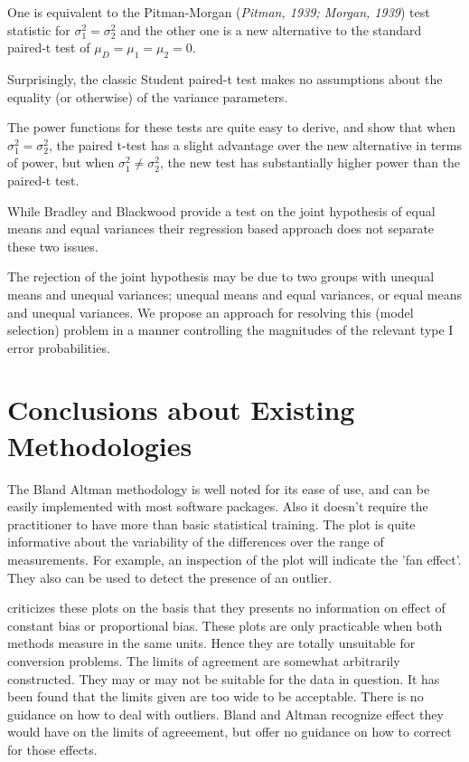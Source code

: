 \documentclass[MAIN.tex]{subfiles}
\begin{document}
	One is equivalent to the Pitman-Morgan (\textit{Pitman, 1939; Morgan, 1939}) test statistic 
	for $\sigma^2_1 = \sigma^2_2$ and the other one is a new alternative to the standard paired-t test of $\mu_D = \mu_1 = \mu_2 = 0$. 
	
	Surprisingly, the classic Student paired-t test makes no assumptions about the equality (or otherwise) of the 
	variance parameters. 
	
	The power functions for these tests are quite easy to derive, and show that when $\sigma^2_1 = \sigma^2_2$, 
	the paired t-test has a slight advantage over the new alternative in terms of power, but when $\sigma^2_1 \neq \sigma^2_2$, the 
	new test has substantially higher power than the paired-t test.
	
	While Bradley and Blackwood provide a test on the joint hypothesis of equal means and equal variances their regression based approach does not separate these two issues.
	
	The rejection of the joint hypothesis may be 
	due to two groups with unequal means and unequal variances; unequal means and equal variances, or equal means and unequal variances. We propose an approach for resolving this (model selection) problem in a manner controlling the magnitudes of the relevant type I error probabilities.
	
	
	
	

	\section{Conclusions about Existing Methodologies}
	
	The Bland Altman methodology is well noted for its ease of use,
	and can be easily implemented with most software packages. Also it
	doesn't require the practitioner to have more than basic
	statistical training. The plot is quite informative about the
	variability of the differences over the range of measurements. For
	example, an inspection of the plot will indicate the 'fan effect'.
	They also can be used to detect the presence of an outlier.
	
	\citet{ludbrook97,ludbrook02} criticizes these plots on the
	basis that they presents no information on effect of constant bias
	or proportional bias. These plots are only practicable when both
	methods measure in the same units. Hence they are totally
	unsuitable for conversion problems. The limits of agreement are
	somewhat arbitrarily constructed. They may or may not be suitable
	for the data in question. It has been found that the limits given
	are too wide to be acceptable. There is no guidance on how to deal
	with outliers. Bland and Altman recognize effect they would have
	on the limits of agreeement, but offer no guidance on how to
	correct for those effects.
	
\end{document}
